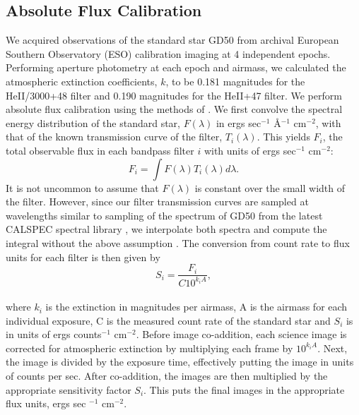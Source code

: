 \documentclass[twocolumn]{aastex62}
\begin{document}
\subsection{Absolute Flux Calibration}
We acquired observations of the standard star GD50 from archival European Southern Observatory (ESO) calibration imaging at 4 independent epochs. Performing aperture photometry at each epoch and airmass, we calculated the atmospheric extinction coefficients, $k$, to be 0.181 magnitudes for the HeII/3000+48 filter and 0.190 magnitudes for the HeII+47 filter. 
We perform absolute flux calibration using the methods of \cite{Jacoby1987}. We first convolve the spectral energy distribution of the standard star, $F(\lambda)$ in ergs sec$^{-1}$ \AA$^{-1}$ cm$^{-2}$, with that of the known transmission curve of the filter, $T_{i}(\lambda)$. This yields $F_i$, the total observable flux in each bandpass filter $i$ with units of ergs sec$^{-1}$ cm$^{-2}$:
\begin{equation*}
F_{i}=\int F(\lambda)T_{i}(\lambda)d\lambda.
\end{equation*}
It is not uncommon to assume that $F(\lambda)$ is constant over the small width of the filter. 
However, since our filter transmission curves are sampled at wavelengths similar to sampling of the spectrum of GD50 from the latest CALSPEC spectral library \citep{Bohlin2017}, we interpolate both spectra and compute the integral without the above assumption . 
The conversion from count rate to flux units for each filter is then given by
\begin{equation*}
S_{i}=\dfrac{F_{i}}{C10^{k_{i}A}},
\end{equation*}\\
where $k_i$ is the extinction in magnitudes per airmass, A is the airmass for each individual exposure, C is the measured count rate of the standard star and $S_i$ is in units of ergs counts$^{-1}$ cm$^{-2}$. Before image co-addition, each science image is corrected for atmospheric extinction by multiplying each frame by $10^{k_{i}A}$. Next, the image is divided by the exposure time, effectively putting the image in units of counts per sec. After co-addition, the images are then multiplied by the appropriate sensitivity factor $S_{i}$. This puts the final images in the appropriate flux units, ergs sec $^{-1}$ cm$^{-2}$.
\end{document}
